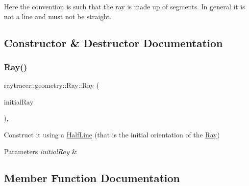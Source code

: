 Here the convention is such that the ray is made up of segments. In general it is not a line and must not be straight. 

\subsection{Constructor \& Destructor Documentation}
\mbox{\label{classraytracer_1_1geometry_1_1Ray_a587ca5392f26083838630091f254cbdb}} 
\subsubsection{\texorpdfstring{Ray()}{Ray()}}
{\footnotesize\ttfamily raytracer\+::geometry\+::\+Ray\+::\+Ray (\begin{DoxyParamCaption}\item[{const \hyperlink{structraytracer_1_1geometry_1_1HalfLine}{Half\+Line} \&}]{initial\+Ray }\end{DoxyParamCaption})\hspace{0.3cm}{\ttfamily [inline]}, {\ttfamily [explicit]}}



Construct it using a \hyperlink{structraytracer_1_1geometry_1_1HalfLine}{Half\+Line} (that is the initial orientation of the \hyperlink{classraytracer_1_1geometry_1_1Ray}{Ray}) 


\begin{DoxyParams}{Parameters}
{\em initial\+Ray} & \\
\hline
\end{DoxyParams}


\subsection{Member Function Documentation}
\mbox{\label{classraytracer_1_1geometry_1_1Ray_a8440acf0af92e6c0718cb137db5e283e}} 
